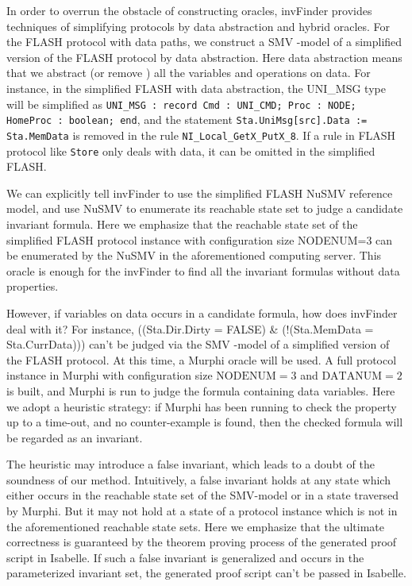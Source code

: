 \documentclass{llncs-new}
\def \twoSpaces {\ \ }
\newcommand{\bedt}[1]{{\color{black}#1}}
\newcommand{\forget}[1]{}
\def \twoSpaces {\ \ }
\begin{document}
 In order to overrun the obstacle of constructing oracles, {\sf invFinder} provides techniques of simplifying protocols by data abstraction  and hybrid oracles. \forget{For a complex protocol, a SMV-model of a  simplified version of this protocol can be used as an external oracle to verify the guessed candidate formulas.} For the FLASH protocol with data paths,  we construct a SMV -model of a simplified version of the FLASH protocol by data abstraction. Here data abstraction means that we abstract (or remove ) all the variables and operations on data. For instance, in the simplified FLASH with data abstraction, the  UNI\_MSG type will be simplified as {\tt UNI\_MSG : record
     Cmd : UNI\_CMD;
     Proc : NODE;
     HomeProc : boolean;
  end}, and the statement {\tt Sta.UniMsg[src].Data := Sta.MemData} is removed in the rule {\tt NI\_Local\_GetX\_PutX\_8}. If a rule in FLASH protocol like {\tt Store} only deals with data, it can be omitted in the simplified FLASH.

  We can explicitly tell {\sf invFinder} to use the simplified FLASH NuSMV reference model,
  and use NuSMV to enumerate its reachable state set to judge a candidate invariant formula. Here we  emphasize that the reachable state set of the simplified FLASH protocol  instance  with configuration size NODENUM=3 can be enumerated by the NuSMV in the aforementioned computing server. This oracle is enough for the {\sf invFinder} to find all the invariant formulas   without data properties.

 However, if    variables on data occurs in a candidate formula, how does {\sf invFinder} deal with it?  For instance, ((Sta.Dir.Dirty = FALSE) \& (!(Sta.MemData = Sta.CurrData))) can't be judged via the SMV -model of a simplified version of the FLASH protocol. At this time, a Murphi oracle will be used.  A full protocol instance in Murphi  with configuration size $\mathrm{NODENUM}=3$ and $\mathrm{DATANUM}=2$ \bedt{is built}, and  Murphi is run to judge the formula containing data variables. Here we adopt a \bedt{heuristic} strategy: \bedt{if Murphi has been running to check the property up to a time-out,} and no counter-example is found, then the checked formula will be regarded as an invariant.

 The \bedt{heuristic} may introduce a false invariant, which leads to a doubt of the soundness of our method.  Intuitively, a  false invariant holds at any   state which either occurs in the reachable state set of the SMV-model or in a state traversed by Murphi. But it may not hold at a state of a protocol instance which is not in the aforementioned reachable state sets. Here we emphasize that the ultimate correctness is guaranteed by the theorem proving process of the generated proof script in Isabelle. If such a false invariant is generalized and occurs in the parameterized invariant set, the generated proof script can't be passed in Isabelle.
\end{document}
